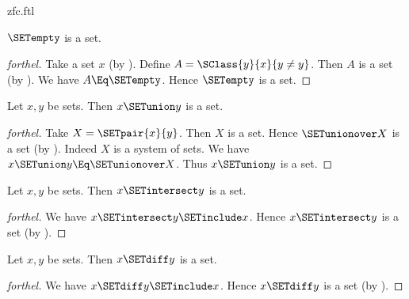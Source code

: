 \documentclass{stex}
\begin{document}
\begin{smodule}{zfc.ftl}

\begin{proposition}[forthel]
  $\SETempty$ is a set.
\end{proposition}
\begin{proof}[forthel]
  Take a set $x$ (by ).
  Define $A = \SClass{y}{x}{y \neq y}$.
  Then $A$ is a set (by ).
  We have $A \Eq \SETempty$.
  Hence $\SETempty$ is a set.
\end{proof}

\begin{proposition}[forthel]
  Let $x, y$ be sets.
  Then $x \SETunion y$ is a set.
\end{proposition}
\begin{proof}[forthel]
  Take $X = \SETpair{x}{y}$.
  Then $X$ is a set.
  Hence $\SETunionover X$ is a set (by ).
  Indeed $X$ is a system of sets.
  We have $x \SETunion y \Eq \SETunionover X$.
  Thus $x \SETunion y$ is a set.
\end{proof}

\begin{proposition}[forthel]
  Let $x, y$ be sets.
  Then $x \SETintersect y$ is a set.
\end{proposition}
\begin{proof}[forthel]
  We have $x \SETintersect y \SETinclude x$.
  Hence $x \SETintersect y$ is a set (by ).
\end{proof}

\begin{proposition}[forthel]
  Let $x, y$ be sets.
  Then $x \SETdiff y$ is a set.
\end{proposition}
\begin{proof}[forthel]
  We have $x \SETdiff y \SETinclude x$.
  Hence $x \SETdiff y$ is a set (by ).
\end{proof}


\end{smodule}
\end{document}
